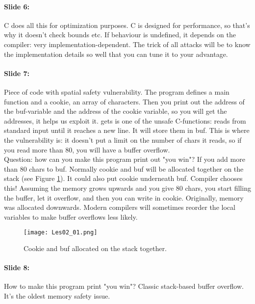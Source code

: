 \documentclass[10pt,a4paper]{report}
\begin{document}
\paragraph{Slide 6:} C does all this for optimization purposes. C is designed for performance, so that's why it doesn't check bounds etc. If behaviour is undefined, it depends on the compiler: very implementation-dependent. The trick of all attacks will be to know the implementation details so well that you can tune it to your advantage.

\paragraph{Slide 7:} Piece of code with spatial safety vulnerability. The program defines a main function and a cookie, an array of characters. Then you print out the address of the buf-variable and the address of the cookie variable, so you will get the addresses, it helps us exploit it. gets is one of the unsafe C-functions: reads from standard input until it reaches a new line. It will store them in buf. This is where the vulnerability is: it doesn't put a limit on the number of chars it reads, so if you read more than 80, you will have a buffer overflow.\\
Question: how can you make this program print out "you win"? If you add more than 80 chars to buf. Normally cookie and buf will be allocated together on the stack (see Figure \ref{les02_01}). It could also put cookie underneath buf. Compiler chooses this! Assuming the memory grows upwards and you give 80 chars, you start filling the buffer, let it overflow, and then you can write in cookie. Originally, memory was allocated downwards. Modern compilers will sometimes reorder the local variables to make buffer overflows less likely.

\begin{figure}[ht!]
\centering
\texttt{[image: Les02\_01.png]}
\caption{Cookie and buf allocated on the stack together.} 
\label{les02_01}
\end{figure}

\paragraph{Slide 8:} How to make this program print "you win"? Classic stack-based buffer overflow. It's the oldest memory safety issue.
\end{document}
